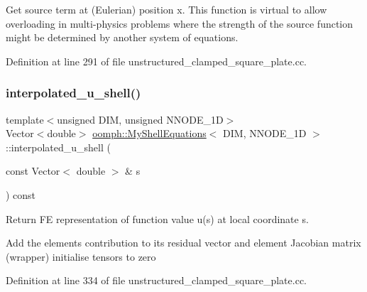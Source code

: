 Get source term at (Eulerian) position x. This function is virtual to allow overloading in multi-\/physics problems where the strength of the source function might be determined by another system of equations. 

Definition at line 291 of file unstructured\+\_\+clamped\+\_\+square\+\_\+plate.\+cc.

\mbox{\label{classoomph_1_1MyShellEquations_a6f170026c39f99db20110a6d6e76e6c0}} 
\subsubsection{\texorpdfstring{interpolated\+\_\+u\+\_\+shell()}{interpolated\_u\_shell()}}
{\footnotesize\ttfamily template$<$unsigned D\+IM, unsigned N\+N\+O\+D\+E\+\_\+1D$>$ \\
Vector$<$double$>$ \hyperlink{classoomph_1_1MyShellEquations}{oomph\+::\+My\+Shell\+Equations}$<$ D\+IM, N\+N\+O\+D\+E\+\_\+1D $>$\+::interpolated\+\_\+u\+\_\+shell (\begin{DoxyParamCaption}\item[{const Vector$<$ double $>$ \&}]{s }\end{DoxyParamCaption}) const\hspace{0.3cm}{\ttfamily [inline]}}



Return FE representation of function value u(s) at local coordinate s. 

Add the element\textquotesingle{}s contribution to its residual vector and element Jacobian matrix (wrapper) initialise tensors to zero 

Definition at line 334 of file unstructured\+\_\+clamped\+\_\+square\+\_\+plate.\+cc.

\mbox{\label{classoomph_1_1MyShellEquations_aa5434267aa4c3a6f0b86d9afbb18f0a5}} 
